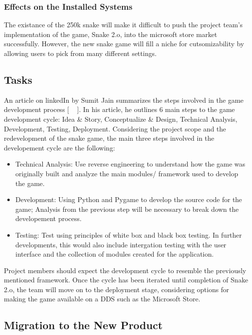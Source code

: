 \documentclass[12pt, titlepage]{article}
\begin{document}
\subsubsection{Effects on the Installed Systems}

The existance of the 250k snake will make it difficult to push the project team's implementation of the game, Snake 2.o, into the microsoft store market successfully. However, the new snake game will fill a niche for cutsomizability by allowing users to pick from many different settings. 

\subsection{Tasks}

An article on linkedIn by Sumit Jain summarizes the steps involved in the game development process [ ~\cite{devArticle} ]. In his article, he outlines 6 main steps to the game development cycle: Idea \& Story, Conceptualize \& Design, Technical Analysis, Development, Testing, Deployment. Considering the project scope and the redevelopment of the snake game, the main three steps involved in the developement cycle are the following:
\begin{itemize}
\item Technical Analysis: Use reverse engineering to understand how the game was originally built and analyze the main modules/ framework used to develop the game.
\item Development: Using Python and Pygame to develop the source code for the game; Analysis from the previous step will be necessary to break down the developement process.
\item Testing: Test using principles of white box and black box testing. In further developments, this would also include intergation testing with the user interface and the collection of modules created for the application. 
\end{itemize}

Project members should expect the development cycle to resemble the previously mentioned framework. Once the cycle has been iterated until completion of Snake 2.o, the team will move on to the deployment stage, considering options for making the game available on a DDS such as the Microsoft Store.   

\subsection{Migration to the New Product}
\end{document}

